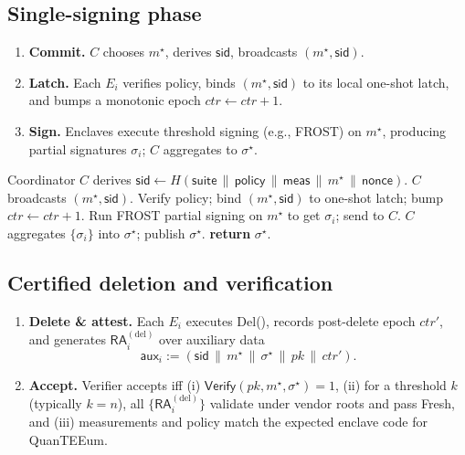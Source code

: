 \documentclass[runningheads,orivec]{llncs}
\newcommand{\prot}{\textsf{QuanTEEum}}
\newcommand{\RA}{\mathsf{RA}}
\newcommand{\FROST}{\textsf{FROST}}
\begin{document}
\subsection{Single-signing phase}
\begin{enumerate}
  \item \textbf{Commit.} $C$ chooses $m^{\star}$, derives $\mathsf{sid}$, broadcasts $(m^{\star},\mathsf{sid})$.
  \item \textbf{Latch.} Each $E_i$ verifies policy, binds $(m^{\star},\mathsf{sid})$ to its local one-shot latch, and bumps a monotonic epoch $ctr \leftarrow ctr{+}1$.
  \item \textbf{Sign.} Enclaves execute threshold signing (e.g., \FROST{}) on $m^{\star}$, producing partial signatures $\sigma_i$; $C$ aggregates to $\sigma^{\star}$.
\end{enumerate}

\begin{algorithm}[!htbp]
\caption{\prot{}: \emph{SingleSign} on designated message $m^{\star}$}
\label{alg:sign}
\begin{small}
\begin{algorithmic}[1]
\State Coordinator $C$ derives $\mathsf{sid} \gets H(\mathsf{suite}\,\|\,\mathsf{policy}\,\|\,\mathsf{meas}\,\|\,m^{\star}\,\|\,\mathsf{nonce})$.
\State $C$ broadcasts $(m^{\star},\mathsf{sid})$.
  \State Verify policy; bind $(m^{\star},\mathsf{sid})$ to one\mbox{-}shot latch; bump $ctr \leftarrow ctr{+}1$.
  \State Run \FROST{} partial signing on $m^{\star}$ to get $\sigma_i$; send to $C$.
\EndFor
\State $C$ aggregates $\{\sigma_i\}$ into $\sigma^{\star}$; publish $\sigma^{\star}$.
\State \textbf{return} $\sigma^{\star}$.
\end{algorithmic}
\end{small}
\end{algorithm}

\subsection{Certified deletion and verification}\label{sec:verify}
\begin{enumerate}
  \item \textbf{Delete \& attest.} Each $E_i$ executes \textsf{Del}(), records post-delete epoch $ctr'$, and generates $\RA_i^{(\mathrm{del})}$ over auxiliary data
  \[
    \textsf{aux}_i := (\mathsf{sid}\,\|\,m^{\star}\,\|\,\sigma^{\star}\,\|\,pk\,\|\,ctr').
  \]
  \item \textbf{Accept.} Verifier accepts iff (i) $\mathsf{Verify}(pk,m^{\star},\sigma^{\star})=1$, (ii) for a threshold $k$ (typically $k{=}n$), all $\{\RA_i^{(\mathrm{del})}\}$ validate under vendor roots and pass \textsf{Fresh}, and (iii) measurements and policy match the expected enclave code for \prot{}.
\end{enumerate}
\end{document}
